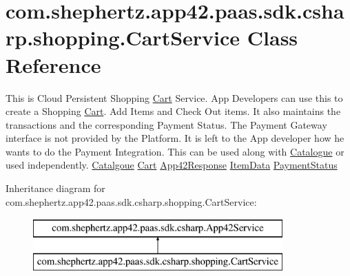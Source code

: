 \hypertarget{classcom_1_1shephertz_1_1app42_1_1paas_1_1sdk_1_1csharp_1_1shopping_1_1_cart_service}{\section{com.\+shephertz.\+app42.\+paas.\+sdk.\+csharp.\+shopping.\+Cart\+Service Class Reference}
\label{classcom_1_1shephertz_1_1app42_1_1paas_1_1sdk_1_1csharp_1_1shopping_1_1_cart_service}
}


This is Cloud Persistent Shopping \hyperlink{classcom_1_1shephertz_1_1app42_1_1paas_1_1sdk_1_1csharp_1_1shopping_1_1_cart}{Cart} Service. App Developers can use this to create a Shopping \hyperlink{classcom_1_1shephertz_1_1app42_1_1paas_1_1sdk_1_1csharp_1_1shopping_1_1_cart}{Cart}. Add Items and Check Out items. It also maintains the transactions and the corresponding Payment Status. The Payment Gateway interface is not provided by the Platform. It is left to the App developer how he wants to do the Payment Integration. This can be used along with \hyperlink{classcom_1_1shephertz_1_1app42_1_1paas_1_1sdk_1_1csharp_1_1shopping_1_1_catalogue}{Catalogue} or used independently. \hyperlink{classcom_1_1shephertz_1_1app42_1_1paas_1_1sdk_1_1csharp_1_1shopping_1_1_cart_service}{Catalgoue} \hyperlink{classcom_1_1shephertz_1_1app42_1_1paas_1_1sdk_1_1csharp_1_1shopping_1_1_cart_service}{Cart} \hyperlink{classcom_1_1shephertz_1_1app42_1_1paas_1_1sdk_1_1csharp_1_1shopping_1_1_cart_service}{App42\+Response} \hyperlink{classcom_1_1shephertz_1_1app42_1_1paas_1_1sdk_1_1csharp_1_1shopping_1_1_cart_service}{Item\+Data} \hyperlink{classcom_1_1shephertz_1_1app42_1_1paas_1_1sdk_1_1csharp_1_1shopping_1_1_cart_service}{Payment\+Status}  


Inheritance diagram for com.\+shephertz.\+app42.\+paas.\+sdk.\+csharp.\+shopping.\+Cart\+Service\+:\begin{figure}[H]
\begin{center}
\leavevmode
\includegraphics[height=2.000000cm]{classcom_1_1shephertz_1_1app42_1_1paas_1_1sdk_1_1csharp_1_1shopping_1_1_cart_service}
\end{center}
\end{figure}
